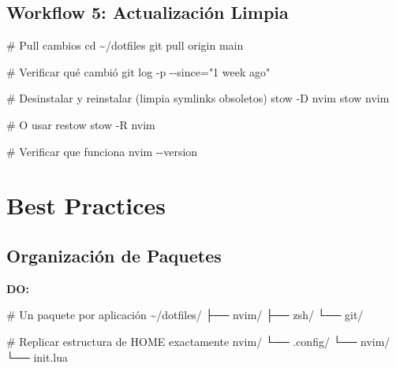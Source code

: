 \documentclass[
  doc,
  floatsintext,
  longtable,
  a4paper,
  nolmodern,
  notxfonts,
  notimes,
  12pt,
  colorlinks=true,linkcolor=blue,citecolor=blue,urlcolor=blue]{apa7}
\newenvironment{Shaded}{\begin{snugshade}}{\end{snugshade}}
\newcommand{\AttributeTok}[1]{\textcolor[rgb]{0.40,0.45,0.13}{#1}}
\newcommand{\BuiltInTok}[1]{\textcolor[rgb]{0.00,0.23,0.31}{#1}}
\newcommand{\CommentTok}[1]{\textcolor[rgb]{0.37,0.37,0.37}{#1}}
\newcommand{\ExtensionTok}[1]{\textcolor[rgb]{0.00,0.23,0.31}{#1}}
\newcommand{\FunctionTok}[1]{\textcolor[rgb]{0.28,0.35,0.67}{#1}}
\newcommand{\NormalTok}[1]{\textcolor[rgb]{0.00,0.23,0.31}{#1}}
\newcommand{\OperatorTok}[1]{\textcolor[rgb]{0.37,0.37,0.37}{#1}}
\newcommand{\StringTok}[1]{\textcolor[rgb]{0.13,0.47,0.30}{#1}}
\begin{document}
\subsection{Workflow 5: Actualización
Limpia}\label{workflow-5-actualizaciuxf3n-limpia}

\begin{Shaded}
\begin{Highlighting}[]
\CommentTok{\# Pull cambios}
\BuiltInTok{cd}\NormalTok{ \textasciitilde{}/dotfiles}
\FunctionTok{git}\NormalTok{ pull origin main}

\CommentTok{\# Verificar qué cambió}
\FunctionTok{git}\NormalTok{ log }\AttributeTok{{-}p} \AttributeTok{{-}{-}since}\OperatorTok{=}\StringTok{"1 week ago"}

\CommentTok{\# Desinstalar y reinstalar (limpia symlinks obsoletos)}
\ExtensionTok{stow} \AttributeTok{{-}D}\NormalTok{ nvim}
\ExtensionTok{stow}\NormalTok{ nvim}

\CommentTok{\# O usar restow}
\ExtensionTok{stow} \AttributeTok{{-}R}\NormalTok{ nvim}

\CommentTok{\# Verificar que funciona}
\ExtensionTok{nvim} \AttributeTok{{-}{-}version}
\end{Highlighting}
\end{Shaded}

\section{Best Practices}\label{best-practices}

\subsection{Organización de Paquetes}\label{organizaciuxf3n-de-paquetes}

\textbf{DO:}

\begin{Shaded}
\begin{Highlighting}[]
\CommentTok{\# Un paquete por aplicación}
\ExtensionTok{\textasciitilde{}/dotfiles/}
\ExtensionTok{├──}\NormalTok{ nvim/}
\ExtensionTok{├──}\NormalTok{ zsh/}
\ExtensionTok{└──}\NormalTok{ git/}

\CommentTok{\# Replicar estructura de HOME exactamente}
\ExtensionTok{nvim/}
  \ExtensionTok{└──}\NormalTok{ .config/}
      \ExtensionTok{└──}\NormalTok{ nvim/}
          \ExtensionTok{└──}\NormalTok{ init.lua}
\end{Highlighting}
\end{Shaded}
\end{document}
